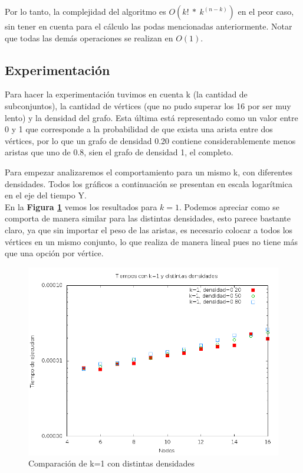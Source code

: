 Por lo tanto, la complejidad del algoritmo es $O(k!\ *\ k^{(n-k)})$ en el peor caso, sin tener en cuenta para el c\'alculo las podas mencionadas anteriormente. Notar que todas las dem\'as operaciones se realizan en $O(1)$.

\subsection{Experimentaci\'on}

Para hacer la experimentaci\'on tuvimos en cuenta k (la cantidad de subconjuntos), la cantidad de v\'ertices (que no pudo superar los 16 por ser muy lento) y la densidad del grafo. Esta \'ultima est\'a representado como un valor entre 0 y 1 que corresponde a la probabilidad de que exista una arista entre dos v\'ertices, por lo que un grafo de densidad 0.20 contiene considerablemente menos aristas que uno de 0.8, sien el grafo de densidad 1, el completo.

Para empezar analizaremos el comportamiento para un mismo k, con diferentes densidades. Todos los gr\'aficos a continuaci\'on se presentan en escala logar\'itmica en el eje del tiempo Y.
\\
En la \textbf{Figura \ref{ej2_k_1}} vemos los resultados para $k=1$. Podemos apreciar como se comporta de manera similar para las distintas densidades, esto parece bastante claro, ya que sin importar el peso de las aristas, es necesario colocar a todos los v\'ertices en un mismo conjunto, lo que realiza de manera lineal pues no tiene m\'as que una opci\'on por v\'ertice.

\begin{figure}[H]
	\begin{center}
		\includegraphics[scale=0.4]{ej2/k_1.png}
	\end{center}
	\caption{Comparaci\'on de k=1 con distintas densidades}
	\label{ej2_k_1}
\end{figure}

